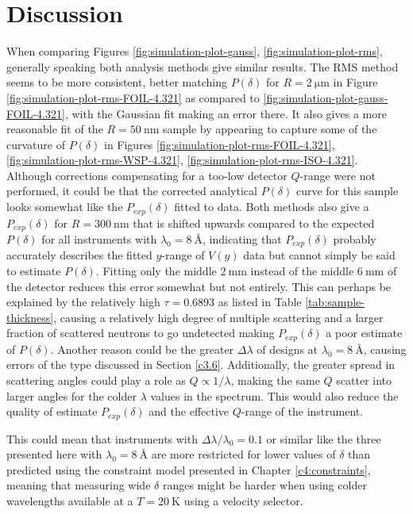 \section{Discussion}
When comparing Figures \ref{fig:simulation-plot-gauss}, \ref{fig:simulation-plot-rms}, generally speaking both analysis methods give similar results. The RMS method seems to be more consistent, better matching $P(\delta)$ for $R=\SI{2}{\micro\meter}$ in Figure \ref{fig:simulation-plot-rms-FOIL-4.321} as compared to \ref{fig:simulation-plot-gauss-FOIL-4.321}, with the Gaussian fit making an error there. It also gives a more reasonable fit of the $R=\SI{50}{\nano\meter}$ sample by appearing to capture some of the curvature of $P(\delta)$ in Figures \ref{fig:simulation-plot-rms-FOIL-4.321}, \ref{fig:simulation-plot-rms-WSP-4.321}, \ref{fig:simulation-plot-rms-ISO-4.321}. Although corrections compensating for a too-low detector $Q$-range \cite{kusmin2017} were not performed, it could be that the corrected analytical $P(\delta)$ curve for this sample looks somewhat like the $P_{exp}(\delta)$ fitted to data. Both methods also give a $P_{exp}(\delta)$ for $R = \SI{300}{\nano\meter}$ that is shifted upwards compared to the expected $P(\delta)$ for all instruments with $\lambda_0 = \SI{8}{\angstrom}$, indicating that $P_{exp}(\delta)$ probably accurately describes the fitted $y$-range of $V(y)$ data but cannot simply be said to estimate $P(\delta)$. Fitting only the middle $\SI{2}{\milli\meter}$ instead of the middle $\SI{6}{\milli\meter}$ of the detector reduces this error somewhat but not entirely. This can perhaps be explained by the relatively high $\tau = 0.6893$ as listed in Table \ref{tab:sample-thickness}, causing a relatively high degree of multiple scattering and a larger fraction of scattered neutrons to go undetected making $P_{exp}(\delta)$ a poor estimate of $P(\delta)$. Another reason could be the greater $\Delta\lambda$ of designs at $\lambda_0 = \SI{8}{\angstrom}$, causing errors of the type discussed in Section \ref{c3.6}. Additionally, the greater spread in scattering angles could play a role as $Q\propto 1/\lambda$, making the same $Q$ scatter into larger angles for the colder $\lambda$ values in the spectrum. This would also reduce the quality of estimate $P_{exp}(\delta)$ and the effective $Q$-range of the instrument.

This could mean that instruments with $\Delta\lambda/\lambda_0 = 0.1$ or similar like the three presented here with $\lambda_0 = \SI{8}{\angstrom}$ are more restricted for lower values of $\delta$ than predicted using the constraint model presented in Chapter \ref{c4:constraints}, meaning that measuring wide $\delta$ ranges might be harder when using colder wavelengths available at a $T=\SI{20}{\kelvin}$ using a velocity selector. 

